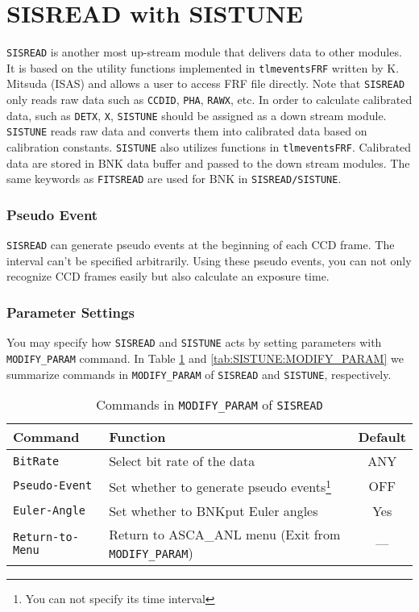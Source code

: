 \section{SISREAD with SISTUNE}\label{sec:SISREAD}
{\tt SISREAD} is another most up-stream module
that delivers data to other modules.
It is based on the utility functions
implemented in {\tt tlmeventsFRF} written by K. Mitsuda (ISAS)
and allows a user to access FRF file directly.
Note that
{\tt SISREAD} only reads raw data
such as {\tt CCDID}, {\tt PHA}, {\tt RAWX}, etc.
In order to calculate calibrated data,
such as {\tt DETX}, {\tt X},
{\tt SISTUNE} should be assigned as a down stream module.
{\tt SISTUNE} reads raw data
and converts them into calibrated data based on calibration constants.
{\tt SISTUNE} also utilizes functions in {\tt tlmeventsFRF}.
Calibrated data are stored in BNK data buffer
and passed to the down stream modules.
The same keywords as {\tt FITSREAD}
are used for BNK in {\tt SISREAD/SISTUNE}.

\subsubsection{Pseudo Event}
{\tt SISREAD} can generate pseudo events at the beginning of each CCD frame.
The interval can't be specified arbitrarily.
Using these pseudo events,
you can not only recognize CCD frames easily
but also calculate an exposure time.

\subsubsection{Parameter Settings}
You may specify how {\tt SISREAD} and {\tt SISTUNE} acts
by setting parameters with {\tt MODIFY\_PARAM} command.
In Table \ref{tab:SISREAD:MODIFY_PARAM} and \ref{tab:SISTUNE:MODIFY_PARAM}
we summarize commands
in {\tt MODIFY\_PARAM} of {\tt SISREAD} and {\tt SISTUNE}, respectively.

\clearpage

\begin{table}[htb]
\begin{minipage}{\textwidth}
\begin{center}
\begin{tabular}{|l|l|c|}
\hline
Command & Function & Default \\ \hline
{\tt BitRate}
	& Select bit rate of the data
	& ANY \\
{\tt Pseudo-Event}
	& Set whether to generate pseudo events\footnote{
		You can not specify its time interval}
	& OFF \\
{\tt Euler-Angle}
	& Set whether to BNKput Euler angles
	& Yes \\
{\tt Return-to-Menu}
	& Return to ASCA\_ANL menu (Exit from {\tt MODIFY\_PARAM})
	& --- \\ \hline
\end{tabular}
\end{center}
\end{minipage}
\caption{Commands in {\tt MODIFY\_PARAM} of {\tt SISREAD}}
\label{tab:SISREAD:MODIFY_PARAM}
\end{table}

